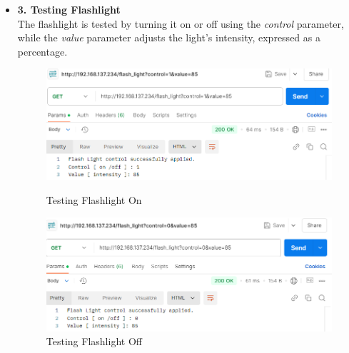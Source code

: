 \documentclass[12pt,a4paper]{report}
\begin{document}
\begin{enumerate}
\begin{itemize}
    \item \textbf{3. Testing Flashlight}
    \\ The flashlight is tested by turning it on or off using the \textit{control} parameter, while the \textit{value} parameter adjusts the light's intensity, expressed as a percentage.
    \begin{figure}[H]
        \centering
        \begin{minipage}{0.45\textwidth}
            \centering
            \includegraphics[width=\textwidth]{flashlightTest1}  %
            \caption{Testing Flashlight On}
            \label{fig:flashlightTest1}
        \end{minipage} \hfill
        \begin{minipage}{0.45\textwidth}
            \centering
            \includegraphics[width=\textwidth]{flashlightTest2}  %
            \caption{Testing Flashlight Off}
            \label{fig:flashlightTest2}
        \end{minipage}
    \end{figure}

   \end{itemize}




    
   
    
    
    
    

\end{enumerate}
\end{document}
